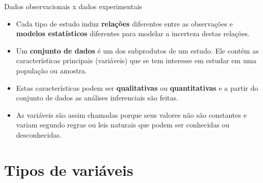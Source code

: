 \documentclass[
  ignorenonframetext,
  serif,
  professionalfont,
  usenames,
  dvipsnames,
  aspectratio = 169]{beamer}
\begin{document}
\begin{frame}{Dados observacionais x dados experimentais}
\label{dados-observacionais-x-dados-experimentais-1}
\begin{itemize}
\item
  Cada tipo de estudo induz \textbf{relações} diferentes entre as
  observações e \textbf{modelos estatísticos} diferentes para modelar a
  incerteza destas relações.
\item
  Um \textbf{conjunto de dados} é um dos subprodutos de um estudo. Ele
  contém as características principais (variáveis) que se tem interesse
  em estudar em uma população ou amostra.
\item
  Estas características podem ser \textbf{qualitativas} ou
  \textbf{quantitativas} e a partir do conjunto de dados as análises
  inferenciais são feitas.
\item
  As variáveis são assim chamadas porque seus valores não são constantes
  e variam segundo regras ou leis naturais que podem ser conhecidas ou
  desconhecidas.
\end{itemize}
\end{frame}

\section{Tipos de variáveis}\label{tipos-de-variuxe1veis}
\end{document}
